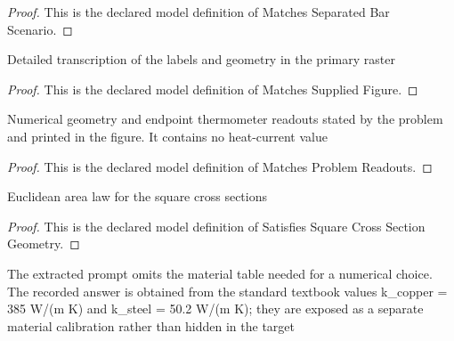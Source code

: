 \begin{proof}
  This is the declared model definition of Matches Separated Bar Scenario.
\end{proof}
\begin{definition}
  \label{def:physics:phyx-mini-0468:phyxminiproblems-problemphyxmini0468-matchessuppliedfigure}
  Detailed transcription of the labels and geometry in the primary raster
\end{definition}
\begin{proof}
  This is the declared model definition of Matches Supplied Figure.
\end{proof}
\begin{definition}
  \label{def:physics:phyx-mini-0468:phyxminiproblems-problemphyxmini0468-matchesproblemreadouts}
  Numerical geometry and endpoint thermometer readouts stated by the problem and printed in the figure. It contains no heat-current value
\end{definition}
\begin{proof}
  This is the declared model definition of Matches Problem Readouts.
\end{proof}
\begin{definition}
  \label{def:physics:phyx-mini-0468:phyxminiproblems-problemphyxmini0468-satisfiessquarecrosssectiongeometry}
  Euclidean area law for the square cross sections
\end{definition}
\begin{proof}
  This is the declared model definition of Satisfies Square Cross Section Geometry.
\end{proof}
\begin{definition}
  \label{def:physics:phyx-mini-0468:phyxminiproblems-problemphyxmini0468-usestextbookthermalconductivities}
  The extracted prompt omits the material table needed for a numerical choice. The recorded answer is obtained from the standard textbook values k\_copper = 385 W/(m K) and k\_steel = 50.2 W/(m K); they are exposed as a separate material calibration rather than hidden in the target
\end{definition}
